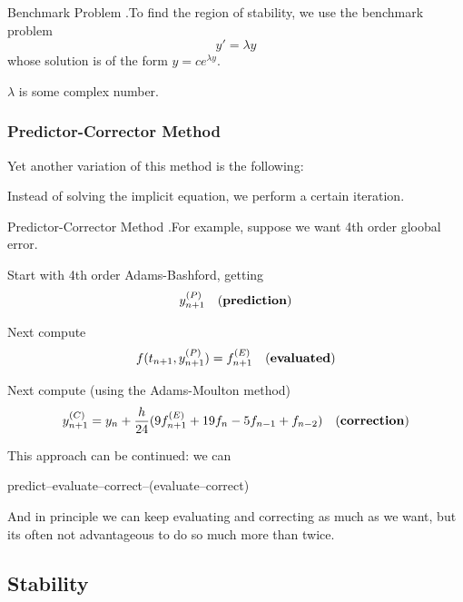 \documentclass[12pt,letterpaper]{article}
\begin{document}
\begin{constr}{Benchmark Problem}
.To find the region of stability, we use the benchmark problem
\begin{equation}
	y' = \lambda y
\end{equation}
whose solution is of the form $y = ce^{\lambda y}$.

$\lambda$ is some complex number.
\end{constr}

\subsubsection{Predictor-Corrector Method}

Yet another variation of this method is the following:

Instead of solving the implicit equation, we perform a certain iteration.

\begin{algo}{Predictor-Corrector Method}
.For example, suppose we want 4th order gloobal error.

Start with 4th order Adams-Bashford, getting 
\begin{equation}
	y_{n+1}^{(P)} \quad \text{(\textbf{prediction})}
\end{equation}

Next compute
\begin{equation}
	f(t_{n+1}, y_{n+1}^{(P)}) = f_{n+1}^{(E)} \quad \text{(\textbf{evaluated})}
\end{equation}

Next compute (using the Adams-Moulton method)
\begin{equation}
	y_{n+1}^{(C)} = y_n + \frac{h}{24}(9 f_{n+1}^{(E)} + 19 f_n - 5f_{n-1} + f_{n-2}) \quad \text{(\textbf{correction})}
\end{equation}
\end{algo}

This approach can be continued: we can
\begin{center}
	predict--evaluate--correct--(evaluate--correct)
\end{center}

And in principle we can keep evaluating and correcting as much as we want, but its often not advantageous to do so much more than twice.

\subsection{Stability}
\end{document}
